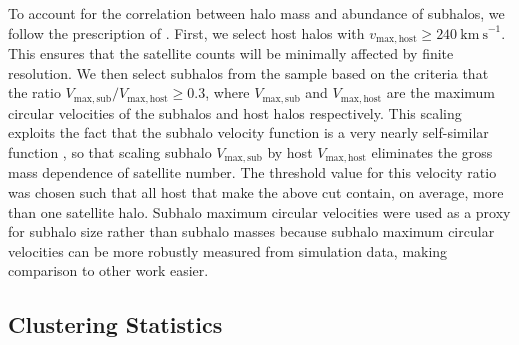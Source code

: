 \documentclass[usenatbib]{mnras}
\begin{document}
To account for the correlation between halo mass and abundance of subhalos, 
we follow the prescription of \citet{wechsler_etal06}. First, we select host halos 
with $v_{\mathrm{max,host}} \ge 240 \ \mathrm{km \ s}^{-1}$. This ensures that the satellite counts 
will be minimally affected by finite resolution. We then select subhalos
from the sample based on the criteria that the ratio $V_{\mathrm{max,sub}}/V_{\mathrm{max,host}} \ge 0.3$, 
where $V_{\mathrm{max,sub}}$ and $V_{\mathrm{max,host}}$ are the maximum circular velocities 
of the subhalos and host halos respectively. This scaling exploits the fact that the subhalo velocity 
function is a very nearly self-similar function \citep[][, and references therein]{zentner_etal05}, 
so that scaling subhalo $V_{\mathrm{max,sub}}$ by host $V_{\mathrm{max,host}}$ 
eliminates the gross mass dependence of satellite number. The threshold value for this velocity ratio was chosen 
such that all host that make the above cut contain, on average, more than one satellite halo. 
Subhalo maximum circular velocities were used as a proxy for subhalo size rather than subhalo masses because 
subhalo maximum circular velocities can be more robustly measured from simulation data, making 
comparison to other work easier.


\subsection{Clustering Statistics}
\label{subsection:clusteringstatistics}
\end{document}
